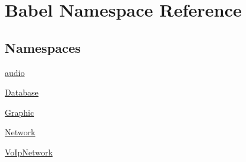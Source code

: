 \hypertarget{namespaceBabel}{}\section{Babel Namespace Reference}
\label{namespaceBabel}
\subsection*{Namespaces}
\begin{DoxyCompactItemize}
\item 
 \hyperlink{namespaceBabel_1_1audio}{audio}
\item 
 \hyperlink{namespaceBabel_1_1Database}{Database}
\item 
 \hyperlink{namespaceBabel_1_1Graphic}{Graphic}
\item 
 \hyperlink{namespaceBabel_1_1Network}{Network}
\item 
 \hyperlink{namespaceBabel_1_1VoIpNetwork}{Vo\+Ip\+Network}
\end{DoxyCompactItemize}

